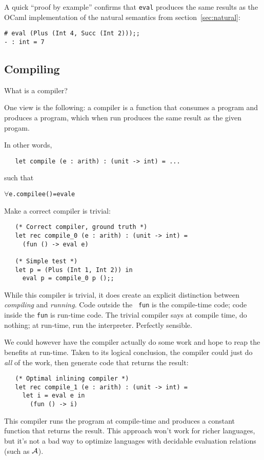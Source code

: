 A quick ``proof by example'' confirms that {\tt eval} produces the
same results as the OCaml implementation of the natural semantics from
section~\ref{sec:natural}:
\begin{verbatim}
# eval (Plus (Int 4, Succ (Int 2)));;
- : int = 7
\end{verbatim}

\subsection{Compiling}

What is a compiler?

One view is the following: a compiler is a function that consumes a
program and produces a program, which when run produces the same
result as the given progam.

In other words,
\begin{verbatim}
   let compile (e : arith) : (unit -> int) = ...
\end{verbatim}
such that
\begin{alltt}
   \(\forall\)e. compile e () = eval e
\end{alltt}

Make a correct compiler is trivial:
\begin{verbatim}
   (* Correct compiler, ground truth *)
   let rec compile_0 (e : arith) : (unit -> int) =
     (fun () -> eval e)

   (* Simple test *)
   let p = (Plus (Int 1, Int 2)) in
     eval p = compile_0 p ();;
\end{verbatim}
While this compiler is trivial, it does create an explicit distinction
between \emph{compiling} and \emph{running}.  Code outside the {\tt
  fun} is the compile-time code; code inside the {\tt fun} is run-time
code.  The trivial compiler says at compile time, do nothing; at
run-time, run the interpreter.  Perfectly sensible.


We could however have the compiler actually do some work and hope to
reap the benefits at run-time.  Taken to its logical conclusion, the
compiler could just do \emph{all} of the work, then generate code that
returns the result:
\begin{verbatim}
   (* Optimal inlining compiler *)
   let rec compile_1 (e : arith) : (unit -> int) =
     let i = eval e in
       (fun () -> i)
\end{verbatim}
This compiler runs the program at compile-time and produces a constant
function that returns the result.  This approach won't work for richer
languages, but it's not a bad way to optimize languages with decidable
evaluation relations (such as $\mathcal{A}$).

